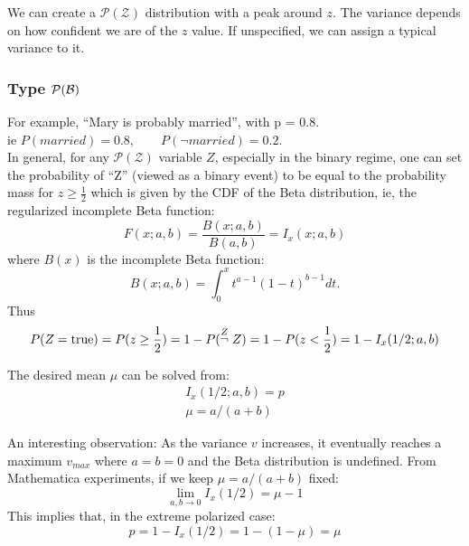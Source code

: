 We can create a $\mathcal{P(Z)}$ distribution with a peak around $z$.  The variance depends on how confident we are of the $z$ value.  If unspecified, we can assign a typical variance to it.

\subsubsection{Type $\mathcal{P(B)}$}

For example, ``Mary is probably married'', with p = 0.8.\\
ie \hspace*{1cm} $P(married) = 0.8, \quad \quad P(\neg married) = 0.2$.\\

In general, for any $\mathcal{P(Z)}$ variable $Z$, especially in the binary regime, one can set the probability of ``Z'' (viewed as a binary event) to be equal to the probability mass for $z \geq \frac{1}{2}$ which is given by the CDF of the Beta distribution, ie, the regularized incomplete Beta function:
$$ F(x; a, b) = \frac{ B(x; a, b) }{ B(a, b) } = I_x(x; a, b) $$
where $B(x)$ is the incomplete Beta function:
$$ B(x; a, b) = \int^x_0 t^{a-1} (1-t)^{b-1} dt \mbox{.}$$
Thus
$$ P(Z = \mbox{true}) = P(z \ge \frac{1}{2}) = 1 - P(\stackrel{Z}{\neg} Z) = 1 - P(z < \frac{1}{2}) = 1 - I_x(1/2; a, b) $$

The desired mean $\mu$ can be solved from:
\begin{eqnarray}
I_x(1/2; a, b) = p\\
\mu = a/(a+b)
\label{eqn:mean-and-p}
\end{eqnarray}

An interesting observation:  As the variance $v$ increases, it eventually reaches a maximum $v_{max}$ where $a=b=0$ and the Beta distribution is undefined.  From Mathematica experiments, if we keep $ \mu = a / (a+b) $  fixed:\\
$$ \lim_{a,b \rightarrow 0} I_x(1/2) = \mu - 1 $$
This implies that, in the extreme polarized case:\\
$$ p = 1 - I_x(1/2) = 1 - (1 - \mu) = \mu $$

%

